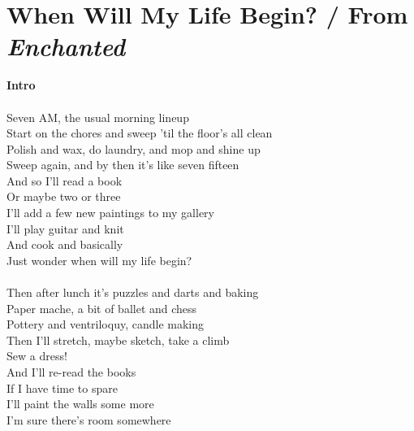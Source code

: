 \section{When Will My Life Begin? / From \emph{Enchanted}}\label{sec:whenwillmylifebegin}

\Amajor
\DmajorEasy
\BflatMajor
\Fmajor
\Bminor
\Eseven
\Eminor



\textbf{Intro}\\
          \\
Seven AM, the usual morning lineup\\
Start on the chores and sweep 'til the floor's all clean\\
Polish and wax, do laundry, and mop and shine up\\
Sweep again, and by then it's like seven fifteen\\
And so I'll read a book\\
Or maybe two or three\\
I'll add a few new paintings to my gallery\\
I'll play guitar and knit\\
And cook and basically\\
Just wonder when will my life begin?\\
      \\
Then after lunch it's puzzles and darts and baking\\
Paper mache, a bit of ballet and chess\\
Pottery and ventriloquy, candle making\\
Then I'll stretch, maybe sketch, take a climb\\
Sew a dress!\\
And I'll re-read the books\\
If I have time to spare\\
I'll paint the walls some more\\
I'm sure there's room somewhere\\
